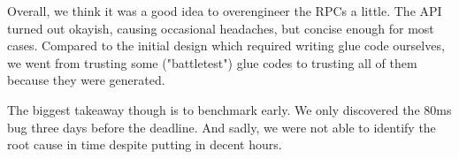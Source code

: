 \begin{hindsight}
Overall, we think it was a good idea to overengineer the RPCs a little. The API turned out okayish, causing occasional headaches, but concise enough for most cases. Compared to the initial design which required writing glue code ourselves, we went from trusting some ("battletest") glue codes to trusting all of them because they were generated. 

The biggest takeaway though is to benchmark early. We only discovered the 80ms bug three days before the deadline. And sadly, we were not able to identify the root cause in time despite putting in decent hours.
\end{hindsight}
